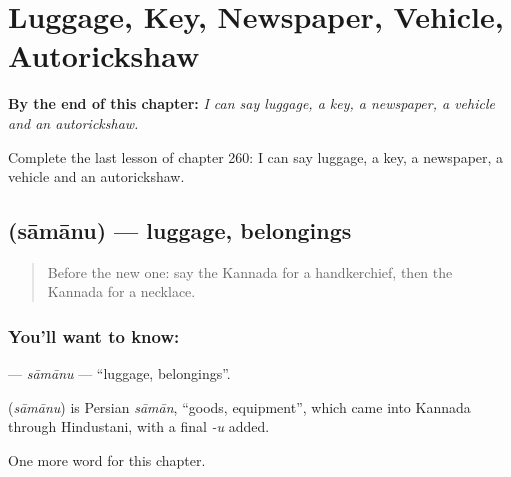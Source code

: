 
\chapter{Luggage, Key, Newspaper, Vehicle, Autorickshaw}
\label{ch:ka-luggage-key-newspaper-vehicle-autorickshaw}

\begin{chapteropening}
\textbf{By the end of this chapter:} \emph{I can say luggage, a key, a newspaper, a vehicle and an autorickshaw.}

Complete the last lesson of chapter 260: I can say luggage, a key, a newspaper, a vehicle and an autorickshaw.
\end{chapteropening}

\section[\texorpdfstring{\kn{ಸಾಮಾನು} (sāmānu)}{ಸಾಮಾನು (sāmānu)}]{ (sāmānu) — luggage, belongings}

\label{lesson:KA-C260-samanu}



\begin{quote}
Before the new one: say the Kannada for a handkerchief, then the Kannada for a necklace.
\end{quote}

\subsection*{You'll want to know: }
\textbf{} — \emph{sāmānu} — \textquotedblleft{}luggage, belongings\textquotedblright{}.

\begin{cousinweb}
\textbf{} (\emph{sāmānu}) is Persian \emph{sāmān}, \textquotedblleft{}goods, equipment\textquotedblright{}, which came into Kannada through Hindustani, with a final \emph{-u} added.
\end{cousinweb}

\begin{grammarlens}[title={What you've built}]
One more word for this chapter.
\end{grammarlens}

